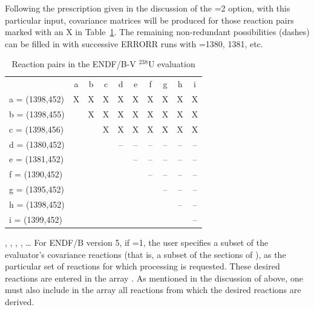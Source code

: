Following the prescription given in the discussion of the
=2 option, with this particular input, covariance matrices
will be produced for those reaction pairs marked with an X in
Table~\ref{pairs}.  The remaining non-redundant possibilities (dashes)
can be filled in with successive ERRORR runs with
=1380, 1381, etc.

\begin{table}[t]
\caption{Reaction pairs in the ENDF/B-V $^{238}$U evaluation}
\label{pairs}
\begin{center}
\begin{tabular}{|l|c|c|c|c|c|c|c|c|c|}
\hline
    & a  &  b  &  c  &  d  &  e  &  f  &  g  &  h  & i \\ \cline{1-10}
a = (1398,452) &  X  &  X  &  X  &  X  &  X  &  X  &  X  &  X  &  X \\
b = (1398,455) &  &  X  &  X &  X  &  X  &  X  &  X  &  X  &  X \\
c = (1398,456) &  &  &  X &  X  &  X  &  X  &  X  &  X  &  X  \\
d = (1380,452) &  &  &  &  -- &  -- &  --  &  -- &  -- &  -- \\
e = (1381,452) &  &  &  &     &  -- &--  &  -- &  -- &  -- \\
f = (1390,452) &  &  &  &     &     &  --  &  -- &  -- &  -- \\
g = (1395,452) &  &  &  &     &     &      &  -- &  -- &  --  \\
h = (1398,452) &  &  &  &     &     &      &     &  -- &  --  \\
i = (1399,452) &  &  &  &     &     &      &     &     &  -- \\
\cline{1-10}
\end{tabular}
\end{center}
\end{table}

, , , , 
\ldots\hspace{.1in}
For ENDF/B version 5, if =1, the user specifies a subset of the
evaluator's covariance reactions (that is, a subset of the sections
of ), as the particular set of reactions for which
processing is requested.  These  desired reactions are
entered in the array .  As mentioned in the discussion of
 above, one must also include in the  array all
reactions from which the desired reactions are derived.

